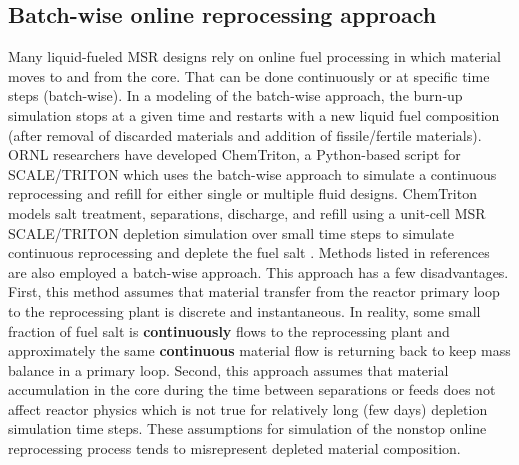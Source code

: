 \subsection{Batch-wise online reprocessing approach}
Many liquid-fueled \gls{MSR} designs rely on online fuel processing in which  
material moves to and from the core. That can be done continuously or at 
specific time steps (batch-wise). In a modeling of the batch-wise approach, 
the burn-up simulation stops at a given 
time and restarts with a new liquid fuel composition (after removal of discarded 
materials and addition of fissile/fertile materials). \gls{ORNL} researchers 
have developed ChemTriton, a Python-based script for SCALE/TRITON which uses the 
batch-wise approach to simulate a continuous reprocessing and refill for 
either single or multiple fluid designs. ChemTriton models salt 
treatment, separations, discharge, and refill using a unit-cell \gls{MSR} 
SCALE/TRITON depletion simulation over small time steps to simulate continuous 
reprocessing and deplete the fuel salt \cite{powers_new_2013}. Methods listed in 
references \cite{zhou_fuel_2018-1, sheu_depletion_2013,
park_whole_2015, jeong_equilibrium_2016, powers_inventory_2014,
betzler_molten_2017,rykhlevskii_modeling_2019} 
are also employed a batch-wise approach. This approach has a few disadvantages. 
First, this method assumes that material transfer from the reactor primary 
loop to the reprocessing plant is discrete and instantaneous. In reality, 
some small fraction of fuel salt is \textbf{continuously} flows to the 
reprocessing plant and approximately the same \textbf{continuous} material flow 
is returning back to keep mass balance in a primary loop. Second, this approach 
assumes that material accumulation in the core 
during the time between separations or feeds does not affect reactor physics which 
is not true for relatively long (few days) depletion simulation time steps. 
These assumptions for simulation of the nonstop online reprocessing process 
tends to misrepresent depleted material composition.

